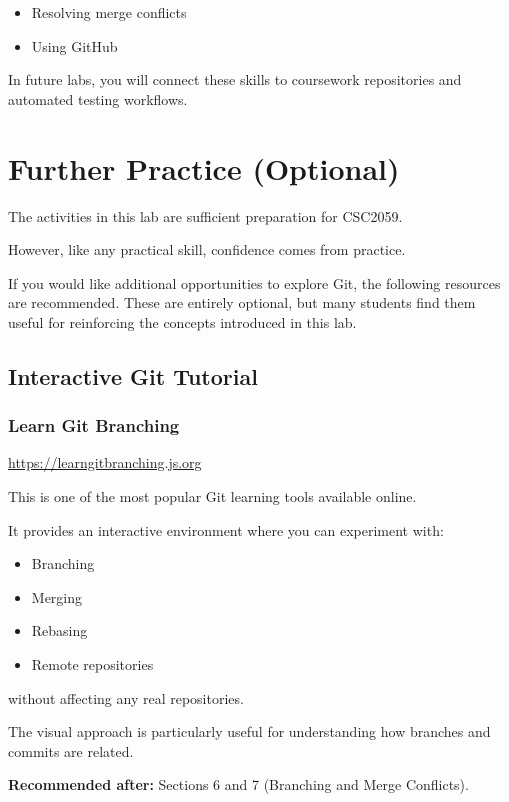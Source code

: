 \documentclass{csc2059practical}
\begin{document}
\begin{wrapupbox}
\begin{itemize}
  \item Resolving merge conflicts
\end{itemize}

\begin{itemize}
  \item Using GitHub
\end{itemize}

In future labs, you will connect these skills to coursework repositories and automated testing workflows.


\end{wrapupbox}
\section{Further Practice (Optional)}
The activities in this lab are sufficient preparation for CSC2059.

However, like any practical skill, confidence comes from practice.

If you would like additional opportunities to explore Git, the following resources are recommended. These are entirely optional, but many students find them useful for reinforcing the concepts introduced in this lab.

\subsection{Interactive Git Tutorial}
\subsubsection{Learn Git Branching}
\url{https://learngitbranching.js.org}

This is one of the most popular Git learning tools available online.

It provides an interactive environment where you can experiment with:

\begin{itemize}
  \item Branching
  \item Merging
  \item Rebasing
  \item Remote repositories
\end{itemize}
without affecting any real repositories.

The visual approach is particularly useful for understanding how branches and commits are related.

\textbf{Recommended after:} Sections 6 and 7 (Branching and Merge Conflicts).
\end{document}

